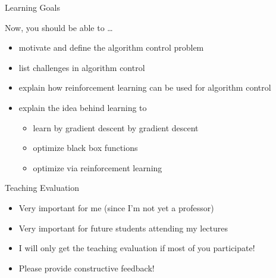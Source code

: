 \begin{frame}[c]{Learning Goals}

Now, you should be able to \ldots

\begin{itemize}
  \item motivate and define the algorithm control problem
  \item list challenges in algorithm control
  \item explain how reinforcement learning can be used for algorithm control
  \item explain the idea behind learning to   
  \begin{itemize}
    \item learn by gradient descent by gradient descent
    \item optimize black box functions
    \item optimize via reinforcement learning
  \end{itemize}
\end{itemize}

\end{frame}
\begin{frame}[c]{Teaching Evaluation}

\begin{itemize}
  \item Very important for me (since I'm not yet a professor)
  \pause
  \item Very important for future students attending my lectures
  \pause
  \item I will only get the teaching evaluation if most of you participate!
  \pause
  \item \alert{Please provide constructive feedback!} 
\end{itemize}

\end{frame}
